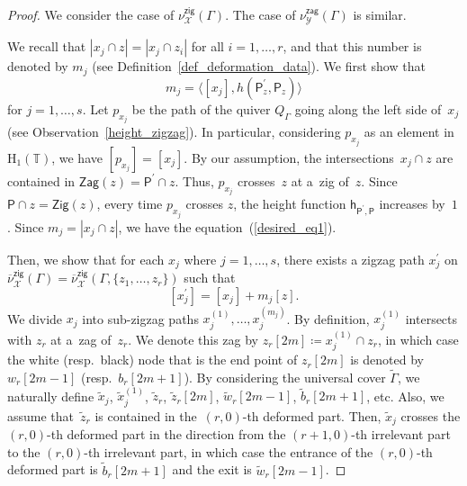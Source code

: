 \documentclass[11pt]{article}
\numberwithin{equation}{section}
\numberwithin{equation}{section}
\numberwithin{figure}{section}
\numberwithin{table}{section}
\newcommand{\TT}{\mathbb{T}}
\newcommand{\rmH}{\mathrm{H}}
\newcommand{\calX}{\mathcal{X}}
\newcommand{\calY}{\mathcal{Y}}
\newcommand{\sfh}{\mathsf{h}}
\newcommand{\sfP}{\mathsf{P}}
\newcommand{\Zig}{\mathsf{Zig}}
\newcommand{\Zag}{\mathsf{Zag}}
\newcommand{\zig}{\mathsf{zig}}
\newcommand{\zag}{\mathsf{zag}}
\begin{document}
\begin{proof}We consider the case of $\nu^\zig_\calX(\Gamma)$. The case of $\nu^\zag_\calY(\Gamma)$ is similar.

We recall that $|x_j\cap z|=|x_j\cap z_i|$ for all $i=1,\dots,r$, and that this number is denoted by $m_j$ (see Definition~\ref{def_deformation_data}).
We first show that
\begin{equation}\label{desired_eq1}
m_j=\langle [x_j],h(\sfP_z^\prime,\sfP_z)\rangle
\end{equation}
for $j=1,\dots,s$. Let $p_{x_j}$ be the path of the quiver $Q_\Gamma$ going along the left side of~$x_j$ (see Observation~\ref{height_zigzag}).
In particular, considering $p_{x_j}$ as an element in $\rmH_1(\TT)$, we have $[p_{x_j}]=[x_j]$.
By our assumption, the intersections~$x_j\cap z$ are contained in $\Zag(z)=\sfP^\prime\cap z$.
Thus, $p_{x_j}$ crosses~$z$ at a~zig of~$z$.
Since $\sfP\cap z=\Zig(z)$, every time $p_{x_j}$ crosses $z$, the height function $\sfh_{\sfP^\prime,\sfP}$ increases by~$1$.
Since $m_j=|x_j\cap z|$, we have the equation~(\ref{desired_eq1}).

Then, we show that for each $x_j$ where $j=1,\dots,s$, there exists a zigzag path $x^{\prime}_j$ on $\overline{\nu}_\calX^\zig(\Gamma)=\overline{\nu}_\calX^\zig(\Gamma,\{z_1,\dots,z_r\})$ such that
\begin{equation}\label{desired_eq2}
[x^{\prime}_j]=[x_j]+m_j[z].
\end{equation}
We divide $x_j$ into sub-zigzag paths $x_j^{(1)},\dots,x_j^{(m_j)}$. By definition, $x_j^{(1)}$ intersects with $z_r$ at a~zag of~$z_r$.
We denote this zag by $z_r[2m]\coloneqq x_j^{(1)}\cap z_r$, in which case the white (resp.\ black) node that is the end point of $z_r[2m]$ is denoted by $w_r[2m-1]$ (resp.~$b_r[2m+1]$).
By considering the universal cover $\widetilde{\Gamma}$, we naturally define $\widetilde{x}_j$, $\widetilde{x}_j^{(1)}$, $\widetilde{z}_r$, $\widetilde{z}_r[2m]$, $\widetilde{w}_r[2m-1]$, $\widetilde{b}_r[2m+1]$, etc.
Also, we assume that~$\widetilde{z}_r$ is contained in the~$(r,0)$-th deformed part.
Then, $\widetilde{x}_j$ crosses the $(r,0)$-th deformed part in the direction from the $(r+1,0)$-th irrelevant part to the $(r,0)$-th irrelevant part,
in which case the entrance of the $(r,0)$-th deformed part is $\widetilde{b}_r[2m+1]$ and the exit is $\widetilde{w}_r[2m-1]$.


\end{proof}
\end{document}
